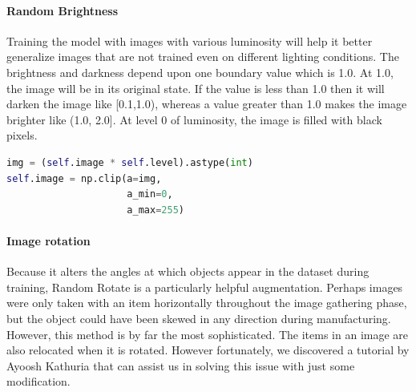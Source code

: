     \paragraph{Random Brightness}
         Training the model with images with various luminosity will help it better generalize images that are not trained even on different lighting conditions\cite{RandomBrightness}. 
         The brightness and darkness depend upon one boundary value which is 1.0.
         At 1.0, the image will be in its original state.
         If the value is less than 1.0 then it will darken the image like [0.1,1.0), whereas a value greater than 1.0 makes the image brighter like (1.0, 2.0].
         At level 0 of luminosity, the image is filled with black pixels.
         \begin{lstlisting}[language=Python]
img = (self.image * self.level).astype(int)
self.image = np.clip(a=img,
                     a_min=0,
                     a_max=255)
         \end{lstlisting}
    \paragraph{Image rotation}
        
        
        Because it alters the angles at which objects appear in the dataset during training, Random Rotate is a particularly helpful augmentation. 
        Perhaps images were only taken with an item horizontally throughout the image gathering phase, but the object could have been skewed in any direction during manufacturing. 
        However, this method is by far the most sophisticated. 
        The items in an image are also relocated when it is rotated.
        However fortunately, we discovered a tutorial by Ayoosh Kathuria that can assist us in solving this issue with just some modification\cite{Rotation}.